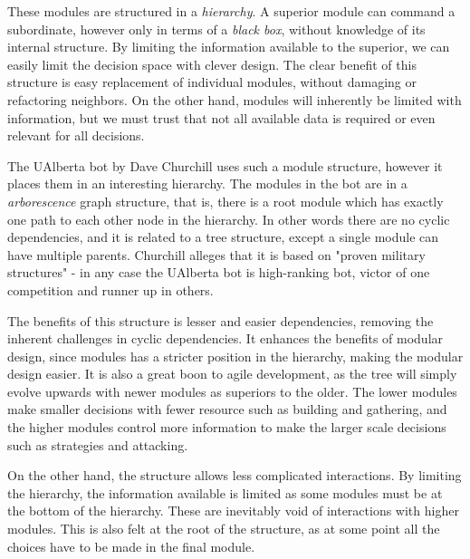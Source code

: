 These modules are structured in a \emph{hierarchy}. A superior module can command a subordinate, however only in terms of a \emph{black box}, without knowledge of its internal structure. By limiting the information available to the superior, we can easily limit the decision space with clever design. The clear benefit of this structure is easy replacement of individual modules, without damaging or refactoring neighbors. On the other hand, modules will inherently be limited with information, but we must trust that not all available data is required or even relevant for all decisions.

The UAlberta bot by Dave Churchill uses such a module structure, however it places them in an interesting hierarchy. The modules in the bot are in a \emph{arborescence} graph structure, that is, there is a root module which has exactly one path to each other node in the hierarchy. In other words there are no cyclic dependencies, and it is related to a tree structure, except a single module can have multiple parents. Churchill alleges that it is based on "proven military structures" - in any case the UAlberta bot is high-ranking bot, victor of one competition and runner up in others. \cite{UAlberta}

The benefits of this structure is lesser and easier dependencies, removing the inherent challenges in cyclic dependencies. It enhances the benefits of modular design, since modules has a stricter position in the hierarchy, making the modular design easier. It is also a great boon to agile development, as the tree will simply evolve upwards with newer modules as superiors to the older. The lower modules make smaller decisions with fewer resource such as building and gathering, and the higher modules control more information to make the larger scale decisions such as strategies and attacking.

On the other hand, the structure allows less complicated interactions. By limiting the hierarchy, the information available is limited as some modules must be at the bottom of the hierarchy. These are inevitably void of interactions with higher modules. This is also felt at the root of the structure, as at some point all the choices have to be made in the final module.

